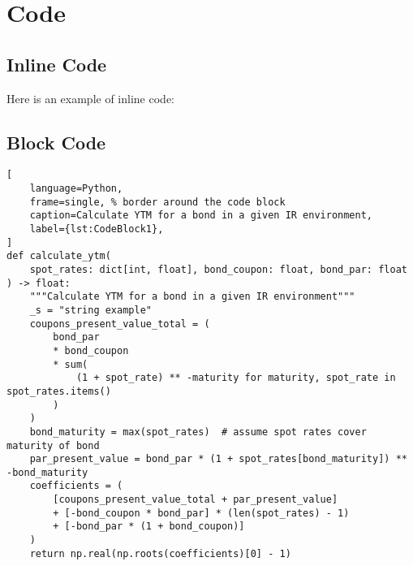 \section{Code}

\subsection{Inline Code}

Here is an example of inline code:

\subsection{Block Code}

\begin{minipage}{\linewidth}
\begin{lstlisting}[
    language=Python,
    frame=single, % border around the code block
    caption=Calculate YTM for a bond in a given IR environment,
    label={lst:CodeBlock1},
]
def calculate_ytm(
    spot_rates: dict[int, float], bond_coupon: float, bond_par: float
) -> float:
    """Calculate YTM for a bond in a given IR environment"""
    _s = "string example"
    coupons_present_value_total = (
        bond_par
        * bond_coupon
        * sum(
            (1 + spot_rate) ** -maturity for maturity, spot_rate in spot_rates.items()
        )
    )
    bond_maturity = max(spot_rates)  # assume spot rates cover maturity of bond
    par_present_value = bond_par * (1 + spot_rates[bond_maturity]) ** -bond_maturity
    coefficients = (
        [coupons_present_value_total + par_present_value]
        + [-bond_coupon * bond_par] * (len(spot_rates) - 1)
        + [-bond_par * (1 + bond_coupon)]
    )
    return np.real(np.roots(coefficients)[0] - 1)
\end{lstlisting}
\end{minipage}